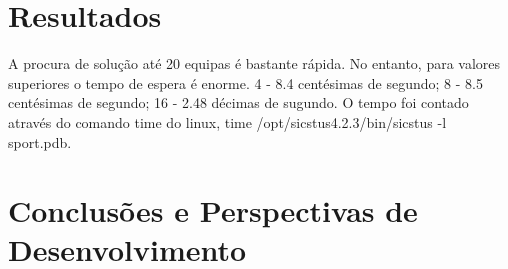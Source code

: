 \documentclass[runningheads,a4paper]{llncs}
\begin{document}
\section{Resultados}
A procura de solução até 20 equipas é bastante rápida. No entanto, para valores superiores o tempo de espera é enorme. 4 - 8.4 centésimas de segundo; 8 - 8.5 centésimas de segundo; 16 - 2.48 décimas de sugundo. O tempo foi contado através do comando time do linux, time /opt/sicstus4.2.3/bin/sicstus -l sport.pdb.

\section{Conclusões e Perspectivas de Desenvolvimento}
\end{document}
